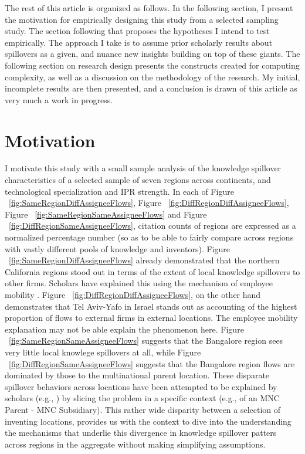 \documentclass[12pt]{article}
\begin{document}
The rest of this article is organized as follows. In the following section, I present the motivation for empirically designing this study from a selected sampling study. The section following that proposes the hypotheses I intend to test empirically. The approach I take is to assume prior scholarly results about spillovers as a given, and nuance new insights building on top of these giants. The following section on research design presents the constructs created for computing complexity, as well as a discussion on the methodology of the research. My initial, incomplete results are then presented, and a conclusion is drawn of this article as very much a work in progress.

\section{Motivation}
I motivate this study with a small sample analysis of the knowledge spillover characteristics of a selected sample of seven regions across continents, and technological specialization and IPR strength. In each of Figure ~\ref{fig:SameRegionDiffAssigneeFlows}, Figure ~\ref{fig:DiffRegionDiffAssigneeFlows}, Figure ~\ref{fig:SameRegionSameAssigneeFlows} and Figure ~\ref{fig:DiffRegionSameAssigneeFlows}, citation counts of regions are expressed as a normalized percentage number (so as to be able to fairly compare across regions with vastly different pools of knowledge and inventors). Figure ~\ref{fig:SameRegionDiffAssigneeFlows}  already demonstrated that the northern California regions stood out in terms of the extent of local knowledge spillovers to other firms. Scholars have explained this using the mechanism of employee mobility \citep{Almeida1999}. Figure ~\ref{fig:DiffRegionDiffAssigneeFlows}, on the other hand demonstrates that Tel Aviv-Yafo in Israel stands out as accounting of the highest proportion of flows to external firms in external locations. The employee mobility explanation may not be able explain the phenomenon here. Figure ~\ref{fig:SameRegionSameAssigneeFlows} suggests that the Bangalore region sees very little local knowlege spillovers at all, while Figure ~\ref{fig:DiffRegionSameAssigneeFlows} suggests that the Bangalore region flows are dominated by those to the multinational parent location. These disparate spillover behaviors across locations have been attempted to be explained by scholars (e.g., \cite{Zhao2006, Singh2007}) by slicing the problem in a specific context (e.g., of an MNC Parent - MNC Subsidiary). This rather wide disparity between a selection of inventing locations, provides us with the context to dive into the understanding the mechanisms that underlie this divergence in knowledge spillover patters across regions in the aggregate without making simplifying assumptions.
\end{document}
